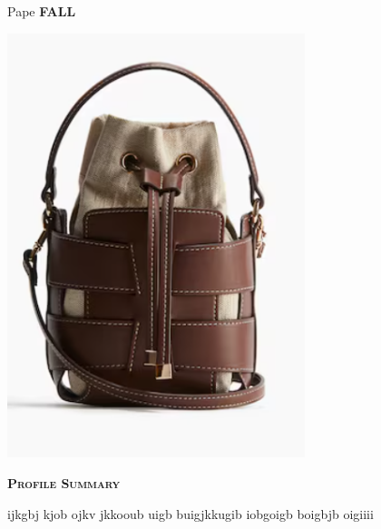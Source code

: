 \documentclass[11pt,a4paper]{article}
\newcommand{\headleft}[1]{\vspace*{3ex}\textsc{\textbf{#1}}\par%
    \vspace*{-1.5ex}\hrulefill\par\vspace*{0.7ex}}
\begin{document}
\setlength{\topskip}{0pt}\setlength{\parindent}{0pt}\setlength{\parskip}{0pt}
\setlength{\fboxsep}{0pt}\pagestyle{empty}\raggedbottom

\begin{minipage}[t]{0.33\textwidth}
\colorbox{cvblue}{\begin{minipage}[t][5mm][t]{\textwidth}\null\hfill\null\end{minipage}}
\vspace{-.2ex}
\colorbox{cvblue!90}{\color{white}
\textwidth
\begin{minipage}[t][293mm][t]{0.82\textwidth}\raggedright
\vspace*{2.5ex}

\Large Pape \textbf{\textsc{FALL}} \normalsize

\null\hfill\includegraphics[width=0.65\textwidth]{a4290a0b3e0a44ce9f9f0c5231de2caa.png}\hfill\null

\vspace*{0.5ex}

\headleft{Profile Summary}
ijkgbj kjob ojkv jkkooub uigb buigjkkugib  iobgoigb boigbjb oigiiii


\end{minipage}}
\end{minipage}
\end{document}
